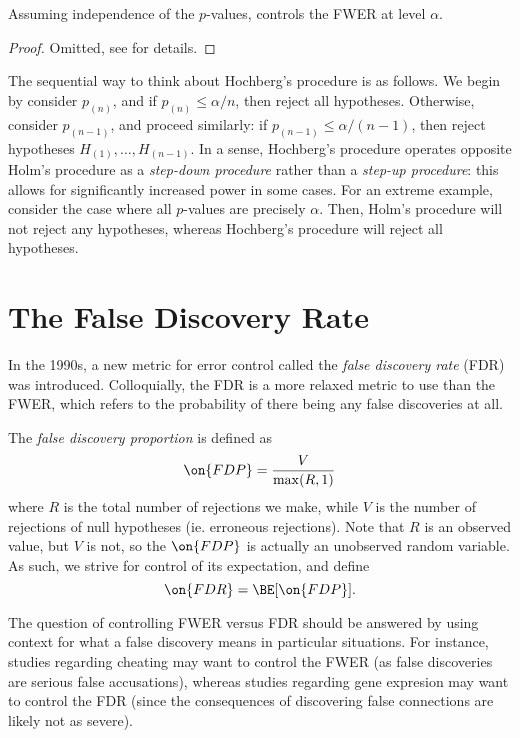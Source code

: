 \documentclass[11pt,reqno]{report}
\theoremstyle{definition}
\numberwithin{equation}{section}
\begin{document}
\begin{prop}
Assuming independence of the $p$-values,  controls the FWER at level $\alpha$.
\end{prop}

\begin{proof}
Omitted, see \cite{stat300} for details.
\end{proof}

\begin{note*}
The sequential way to think about Hochberg's procedure is as follows. We begin by consider $p_{(n)}$, and if $p_{(n)} \leq \alpha / n$, then reject all hypotheses. Otherwise, consider $p_{(n-1)}$, and proceed similarly: if $p_{(n-1)} \leq \alpha / (n-1)$, then reject hypotheses $H_{(1)}, \ldots, H_{(n-1)}$. In a sense, Hochberg's procedure operates opposite Holm's procedure as a \emph{step-down procedure} rather than a \emph{step-up procedure}: this allows for significantly increased power in some cases. For an extreme example, consider the case where all $p$-values are precisely $\alpha$. Then, Holm's procedure will not reject any hypotheses, whereas Hochberg's procedure will reject all hypotheses. 
\end{note*}



\section{The False Discovery Rate} 
In the 1990s, a new metric for error control called the \emph{false discovery rate} (FDR) was introduced. Colloquially, the FDR is a more relaxed metric to use than the FWER, which refers to the probability of there being any false discoveries at all.
\begin{defn}
The \emph{false discovery proportion} is defined as
\begin{equation}
\on{FDP} = \frac{V}{\max(R, 1)}
\end{equation}
where $R$ is the total number of rejections we make, while $V$ is the number of rejections of null hypotheses (ie. erroneous rejections). Note that $R$ is an observed value, but $V$ is not, so the $\on{FDP}$ is actually an unobserved random variable. As such, we strive for control of its expectation, and define
\begin{equation}
\on{FDR} = \BE[\on{FDP}].
\end{equation}

\end{defn}
The question of controlling FWER versus FDR should be answered by using context for what a false discovery means in particular situations. For instance, studies regarding cheating may want to control the FWER (as false discoveries are serious false accusations), whereas studies regarding gene expresion may want to control the FDR (since the consequences of discovering false connections are likely not as severe). 
\end{document}
